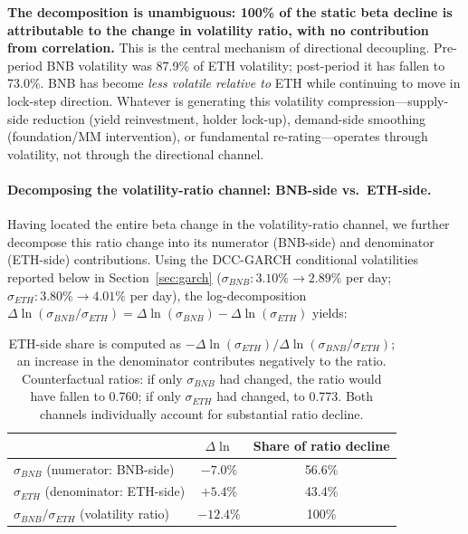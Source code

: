 \documentclass[11pt,a4paper]{article}
\begin{document}
\textbf{The decomposition is unambiguous: 100\% of the static beta decline is attributable to the change in volatility ratio, with no contribution from correlation.} This is the central mechanism of directional decoupling. Pre-period BNB volatility was 87.9\% of ETH volatility; post-period it has fallen to 73.0\%. BNB has become \emph{less volatile relative to} ETH while continuing to move in lock-step direction. Whatever is generating this volatility compression---supply-side reduction (yield reinvestment, holder lock-up), demand-side smoothing (foundation/MM intervention), or fundamental re-rating---operates through volatility, not through the directional channel.

\paragraph{Decomposing the volatility-ratio channel: BNB-side vs.\ ETH-side.} \label{sec:numdenom} Having located the entire beta change in the volatility-ratio channel, we further decompose this ratio change into its numerator (BNB-side) and denominator (ETH-side) contributions. Using the DCC-GARCH conditional volatilities reported below in Section~\ref{sec:garch} ($\sigma_{BNB}: 3.10\% \to 2.89\%$ per day; $\sigma_{ETH}: 3.80\% \to 4.01\%$ per day), the log-decomposition $\Delta \ln(\sigma_{BNB}/\sigma_{ETH}) = \Delta \ln(\sigma_{BNB}) - \Delta \ln(\sigma_{ETH})$ yields:

\begin{table}[H]
\centering
\caption{Numerator vs.\ denominator decomposition of the volatility-ratio change}
\label{tab:numdenom}
\begin{tabular}{lcc}
\toprule
& \textbf{$\Delta \ln$} & \textbf{Share of ratio decline} \\
\midrule
$\sigma_{BNB}$ (numerator: BNB-side) & $-7.0\%$ & 56.6\% \\
$\sigma_{ETH}$ (denominator: ETH-side) & $+5.4\%$ & 43.4\% \\
\midrule
$\sigma_{BNB}/\sigma_{ETH}$ (volatility ratio) & $-12.4\%$ & 100\% \\
\bottomrule
\end{tabular}
\caption*{\footnotesize ETH-side share is computed as $-\Delta \ln(\sigma_{ETH}) / \Delta \ln(\sigma_{BNB}/\sigma_{ETH})$; an increase in the denominator contributes negatively to the ratio. Counterfactual ratios: if only $\sigma_{BNB}$ had changed, the ratio would have fallen to 0.760; if only $\sigma_{ETH}$ had changed, to 0.773. Both channels individually account for substantial ratio decline.}
\end{table}
\end{document}
